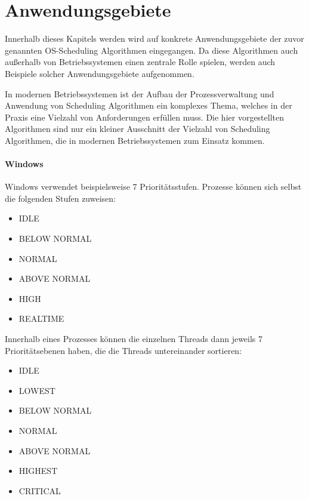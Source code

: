 \chapter{Anwendungsgebiete}
Innerhalb dieses Kapitels werden wird auf konkrete Anwendungsgebiete der zuvor genannten OS-Scheduling Algorithmen eingegangen. Da diese Algorithmen auch außerhalb von Betriebssystemen einen zentrale Rolle spielen, werden auch Beispiele solcher Anwendungsgebiete aufgenommen.

In modernen Betriebssystemen ist der Aufbau der Prozessverwaltung und Anwendung von Scheduling Algorithmen ein komplexes Thema, welches in der Praxis eine Vielzahl von Anforderungen erfüllen muss. Die hier vorgestellten Algorithmen sind nur ein kleiner Ausschnitt der Vielzahl von Scheduling Algorithmen, die in modernen Betriebssystemen zum Einsatz kommen.

\subsubsection{Windows}
Windows verwendet beispielsweise 7 Prioritätsstufen.
Prozesse können sich selbst die folgenden Stufen zuweisen:
\begin{multicols}{3}
    \begin{itemize}[noitemsep]
        \item IDLE
        \item BELOW NORMAL
        \item NORMAL
        \item ABOVE NORMAL
        \item HIGH
        \item REALTIME
    \end{itemize}
\end{multicols}

Innerhalb eines Prozesses können die einzelnen Threads dann jeweils 7 Prioritätsebenen haben, die die Threads untereinander sortieren:
\begin{multicols}{3}
    \begin{itemize}[noitemsep]
        \item IDLE
        \item LOWEST
        \item BELOW NORMAL
        \item NORMAL
        \item ABOVE NORMAL
        \item HIGHEST
        \item CRITICAL
    \end{itemize}
\end{multicols}

